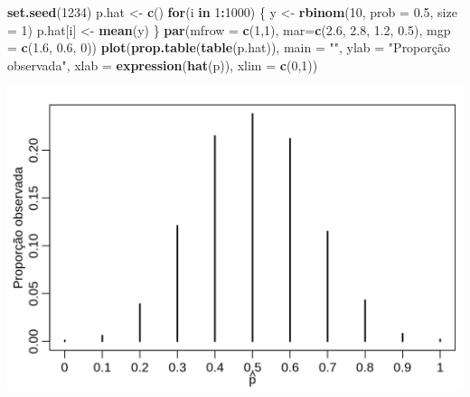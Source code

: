 \documentclass[10pt,a4paper]{book}
\newenvironment{Shaded}{\begin{snugshade}}{\end{snugshade}}
\newcommand{\KeywordTok}[1]{\textcolor[rgb]{0.13,0.29,0.53}{\textbf{#1}}}
\newcommand{\DataTypeTok}[1]{\textcolor[rgb]{0.13,0.29,0.53}{#1}}
\newcommand{\DecValTok}[1]{\textcolor[rgb]{0.00,0.00,0.81}{#1}}
\newcommand{\FloatTok}[1]{\textcolor[rgb]{0.00,0.00,0.81}{#1}}
\newcommand{\StringTok}[1]{\textcolor[rgb]{0.31,0.60,0.02}{#1}}
\newcommand{\ControlFlowTok}[1]{\textcolor[rgb]{0.13,0.29,0.53}{\textbf{#1}}}
\newcommand{\OperatorTok}[1]{\textcolor[rgb]{0.81,0.36,0.00}{\textbf{#1}}}
\newcommand{\NormalTok}[1]{#1}
\begin{document}
\begin{Shaded}
\begin{Highlighting}[]
\KeywordTok{set.seed}\NormalTok{(}\DecValTok{1234}\NormalTok{)}
\NormalTok{p.hat <-}\StringTok{ }\KeywordTok{c}\NormalTok{()}
\ControlFlowTok{for}\NormalTok{(i }\ControlFlowTok{in} \DecValTok{1}\OperatorTok{:}\DecValTok{1000}\NormalTok{) \{}
\NormalTok{  y <-}\StringTok{ }\KeywordTok{rbinom}\NormalTok{(}\DecValTok{10}\NormalTok{, }\DataTypeTok{prob =} \FloatTok{0.5}\NormalTok{, }\DataTypeTok{size =} \DecValTok{1}\NormalTok{)}
\NormalTok{  p.hat[i] <-}\StringTok{ }\KeywordTok{mean}\NormalTok{(y)}
\NormalTok{\}}
\KeywordTok{par}\NormalTok{(}\DataTypeTok{mfrow =} \KeywordTok{c}\NormalTok{(}\DecValTok{1}\NormalTok{,}\DecValTok{1}\NormalTok{), }\DataTypeTok{mar=}\KeywordTok{c}\NormalTok{(}\FloatTok{2.6}\NormalTok{, }\FloatTok{2.8}\NormalTok{, }\FloatTok{1.2}\NormalTok{, }\FloatTok{0.5}\NormalTok{), }\DataTypeTok{mgp =} \KeywordTok{c}\NormalTok{(}\FloatTok{1.6}\NormalTok{, }\FloatTok{0.6}\NormalTok{, }\DecValTok{0}\NormalTok{))}
\KeywordTok{plot}\NormalTok{(}\KeywordTok{prop.table}\NormalTok{(}\KeywordTok{table}\NormalTok{(p.hat)), }\DataTypeTok{main =} \StringTok{""}\NormalTok{, }
     \DataTypeTok{ylab =} \StringTok{"Proporção observada"}\NormalTok{,}
     \DataTypeTok{xlab =} \KeywordTok{expression}\NormalTok{(}\KeywordTok{hat}\NormalTok{(p)), }\DataTypeTok{xlim =} \KeywordTok{c}\NormalTok{(}\DecValTok{0}\NormalTok{,}\DecValTok{1}\NormalTok{))}
\end{Highlighting}
\end{Shaded}

\begin{center}\includegraphics{figures/unnamed-chunk-387-1} \end{center}
\end{document}
